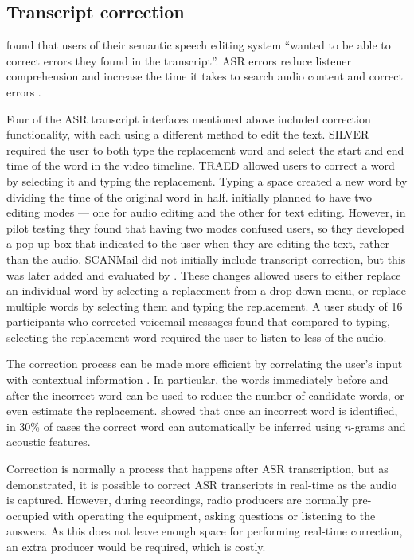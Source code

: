 \subsection{Transcript correction}

\citet{Whittaker2004} found that users of their semantic speech editing system ``wanted to be able to correct errors
they found in the transcript''. ASR errors reduce listener comprehension \citep{Stark2000,Vemuri2004} and increase the
time it takes to search audio content \citep{Ranjan2006} and correct errors \citep{Burke2006}.


Four of the ASR transcript interfaces mentioned above included correction functionality, with each using a different
method to edit the text.  SILVER \citep{Casares2002} required the user to both type the replacement word and select the
start and end time of the word in the video timeline.  TRAED \citep{Masoodian2006} allowed users to correct a word by
selecting it and typing the replacement. Typing a space created a new word by dividing the time of the original word in
half.  \citet{Sivaraman2016} initially planned to have two editing modes --- one for audio editing and the other for
text editing.  However, in pilot testing they found that having two modes confused users, so they developed a pop-up
box that indicated to the user when they are editing the text, rather than the audio.  SCANMail did not initially
include transcript correction, but this was later added and evaluated by \citet{Burke2006}.  These changes allowed
users to either replace an individual word by selecting a replacement from a drop-down menu, or replace multiple words
by selecting them and typing the replacement.  A user study of 16 participants who corrected voicemail messages found that
compared to typing, selecting the replacement word required the user to listen to less of the audio.

The correction process can be made more efficient by correlating the user's input with contextual information
\citep{Suhm2001}.  In particular, the words immediately before and after the incorrect word can be used to reduce the
number of candidate words, or even estimate the replacement.  \citet{Liang2014} showed that once an incorrect word is
identified, in 30\% of cases the correct word can automatically be inferred using $n$-grams and acoustic features.

Correction is normally a process that happens after ASR transcription, but as \citet{Wald2007} demonstrated, it is
possible to correct ASR transcripts in real-time as the audio is captured. However, during recordings, radio producers
are normally pre-occupied with operating the equipment, asking questions or listening to the answers. As this does not
leave enough space for performing real-time correction, an extra producer would be required, which is costly.

